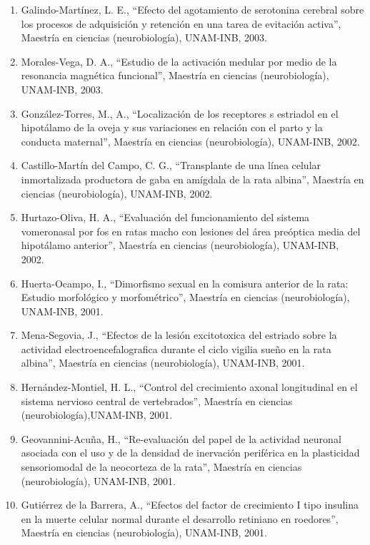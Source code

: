 \begin{enumerate}
\item Galindo-Martínez, L. E., “Efecto del agotamiento de serotonina cerebral sobre los procesos de adquisición y retención 
en 
una tarea de evitación activa”, Maestría en ciencias (neurobiología), UNAM-INB, 2003.

\item Morales-Vega, D. A., “Estudio de la activación medular por medio de la resonancia magnética funcional”, Maestría en 
ciencias (neurobiología), UNAM-INB, 2003.

\item González-Torres, M., A., “Localización de los receptores s estriadol en el hipotálamo de la oveja y sus variaciones en 
relación con el parto y la conducta maternal”, Maestría en ciencias (neurobiología), UNAM-INB,
2002.

\item Castillo-Martín del Campo, C. G., “Transplante de una línea celular inmortalizada productora de gaba en amígdala de la 
rata albina”, Maestría en ciencias (neurobiología), UNAM-INB, 2002.

\item Hurtazo-Oliva, H. A., “Evaluación del funcionamiento del sistema vomeronasal por fos en ratas macho con lesiones del 
área 
preóptica media del hipotálamo anterior”, Maestría en ciencias (neurobiología), UNAM-INB, 2002.

\item Huerta-Ocampo, I., “Dimorfismo sexual en la comisura anterior de la rata: Estudio morfológico y morfométrico”, Maestría 
en ciencias (neurobiología), UNAM-INB, 2001.

\item Mena-Segovia, J., “Efectos de la lesión excitotoxica del estriado sobre la actividad electroencefalografica durante el 
ciclo vigilia sueño en la rata albina”, Maestría en ciencias (neurobiología), UNAM-INB, 2001.

\item Hernández-Montiel, H. L., “Control del crecimiento axonal longitudinal en el sistema nervioso central de vertebrados”, 
Maestría en ciencias (neurobiología),UNAM-INB, 2001.

\item Geovannini-Acuña, H., “Re-evaluación del papel de la actividad neuronal asociada con el uso y de la densidad de 
inervación periférica en la plasticidad sensoriomodal de la neocorteza de la rata”, Maestría en ciencias (neurobiología), 
UNAM-INB, 2001.

\item Gutiérrez de la Barrera, A., “Efectos del factor de crecimiento I tipo insulina en la muerte celular normal durante el 
desarrollo retiniano en roedores”, Maestría en ciencias (neurobiología), UNAM-INB, 2001.


\end{enumerate}
